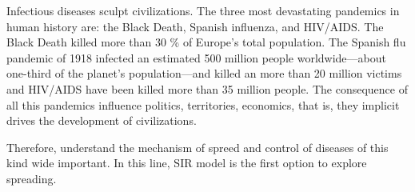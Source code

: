 Infectious diseases sculpt civilizations. The three most devastating pandemics 
in human history are: the Black Death, Spanish influenza, and HIV/AIDS.
The Black Death killed more than 30 \% of Europe's total 
population. The Spanish flu pandemic of 1918 infected an estimated 500 million 
people worldwide—about one-third of the planet's population—and killed an more 
than 20 million victims and HIV/AIDS have been killed more than 35 million 
people. The consequence of all this pandemics influence politics, 
territories, economics, that is, they implicit drives the development of 
civilizations.

Therefore, understand the mechanism of spreed and control of diseases of this 
kind wide important. In this line, SIR model is the first option to explore 
spreading.
